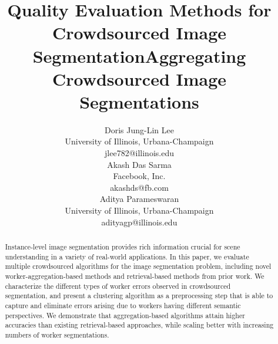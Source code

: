 \documentclass[letterpaper]{article} %
\title{Quality Evaluation Methods for Crowdsourced Image Segmentation}
\begin{document}
           \title{Aggregating Crowdsourced Image Segmentations}
            \author{%
              Doris Jung-Lin Lee\\
              University of Illinois, Urbana-Champaign\\
              jlee782@illinois.edu\\
            \And
              Akash Das Sarma\\
              Facebook, Inc.\\
              akashds@fb.com\\
            \And 
              Aditya Parameswaran\\
              University of Illinois, Urbana-Champaign\\
              adityagp@illinois.edu\\
            }
           \maketitle
           \vspace{-8pt}
           \begin{abstract}
           \vspace{-7pt}
           Instance-level image segmentation provides rich information crucial for scene understanding in a variety of real-world applications. In this paper, we evaluate multiple crowdsourced algorithms for the image segmentation problem, including novel worker-aggregation-based methods and retrieval-based methods from prior work. We characterize the different types of worker errors observed in crowdsourced segmentation, and present a clustering algorithm as a preprocessing step that is able to capture and eliminate errors arising due to workers having different semantic perspectives. We demonstrate that aggregation-based algorithms attain higher accuracies than existing retrieval-based approaches, while scaling better with increasing numbers of worker segmentations. 
           \vspace{-2pt}
          \end{abstract}
          
          
          
          
          
          
          


\end{document}
